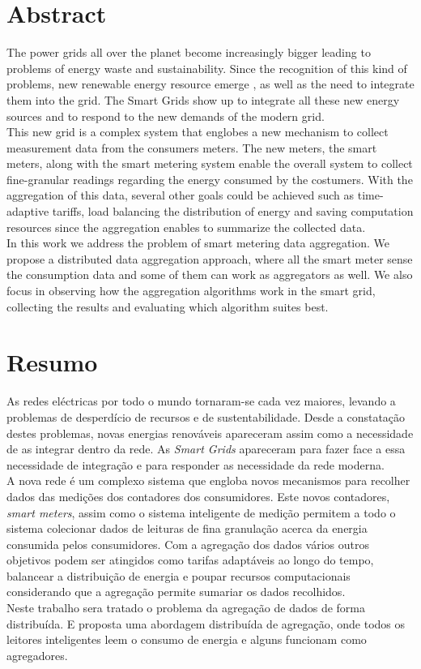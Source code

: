 \chapter*{Abstract}
 The power grids all over the planet become increasingly bigger leading to problems of energy waste and sustainability. Since the recognition of this kind of problems, new renewable energy resource emerge , as well as the need to integrate them into the grid. The Smart Grids show up to integrate all these new energy sources and to respond to the new demands of the modern grid. \\
This new grid is a complex system that englobes a new mechanism to collect measurement data from the consumers meters. The new meters, the smart meters, along with the smart metering system enable the overall system to collect fine-granular readings regarding the energy consumed by the costumers. With the aggregation of this data, several other goals could be achieved such as time-adaptive tariffs, load balancing the distribution of energy and saving computation resources since the aggregation enables to summarize the collected data.\\
In this work we address the problem of smart metering data aggregation. We propose a distributed data aggregation approach, where all the smart meter sense the consumption data and some of them can work as aggregators as well. We also focus in observing how the aggregation algorithms work in the smart grid, collecting the results and evaluating which algorithm suites best.

	\cleardoublepage

\chapter*{Resumo}
	As redes eléctricas por todo o mundo tornaram-se cada vez maiores, levando a problemas de desperdício de recursos e de sustentabilidade. Desde a constatação destes problemas, novas energias  renováveis apareceram assim como a necessidade de as integrar dentro da rede. As \textit{Smart Grids} apareceram para fazer face a essa necessidade de integração e para responder as necessidade da rede moderna.\\
	A nova rede é um complexo sistema que engloba novos mecanismos para recolher dados das medições dos contadores dos consumidores. Este novos contadores, \textit{smart meters}, assim como o sistema inteligente de medição permitem a todo o sistema colecionar dados de leituras de fina granulação acerca da energia consumida pelos consumidores. Com a agregação dos dados vários outros objetivos podem ser atingidos como tarifas adaptáveis ao longo do tempo, balancear a distribuição de energia e poupar recursos computacionais considerando que a agregação permite sumariar os dados recolhidos.\\
	Neste trabalho sera tratado o problema da agregação de dados de forma distribuída.  E proposta uma abordagem distribuída de agregação, onde todos os leitores inteligentes leem o consumo de energia e alguns funcionam como agregadores.

